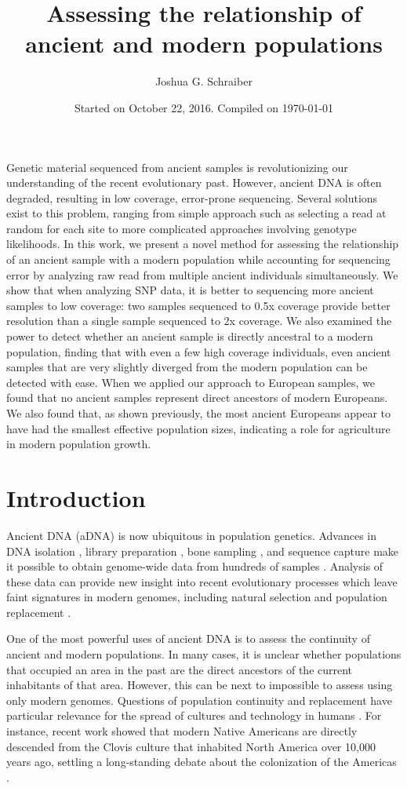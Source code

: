 \documentclass[11pt, oneside]{article}   	%
\title{Assessing the relationship of ancient and modern populations}
\author{Joshua G. Schraiber}
\date{Started on October 22, 2016. Compiled on \today}							%
\begin{document}
\maketitle

\abstract
Genetic material sequenced from ancient samples is revolutionizing our understanding of the recent evolutionary past. However, ancient DNA is often degraded, resulting in low coverage, error-prone sequencing. Several solutions exist to this problem, ranging from simple approach such as selecting a read at random for each site to more complicated approaches involving genotype likelihoods. In this work, we present a novel method for assessing the relationship of an ancient sample with a modern population while accounting for sequencing error by analyzing raw read from multiple ancient individuals simultaneously. We show that when analyzing SNP data, it is better to sequencing more ancient samples to low coverage: two samples sequenced to 0.5x coverage provide better resolution than a single sample sequenced to 2x coverage. We also examined the power to detect whether an ancient sample is directly ancestral to a modern population, finding that with even a few high coverage individuals, even ancient samples that are very slightly diverged from the modern population can be detected with ease. When we applied our approach to European samples, we found that no ancient samples represent direct ancestors of modern Europeans. We also found that, as shown previously, the most ancient Europeans appear to have had the smallest effective population sizes, indicating a role for agriculture in modern population growth.

\section{Introduction}
Ancient DNA (aDNA) is now ubiquitous in population genetics. Advances in DNA isolation \citep{dabney2013ancient}, library preparation \citep{meyer2012high}, bone sampling \citep{pinhasi2015optimal}, and sequence capture \cite{haak2015massive} make it possible to obtain genome-wide data from hundreds of samples \citep{haak2015massive, mathieson2015genome, allentoft2015population, fu2016genetic}. Analysis of these data can provide new insight into recent evolutionary processes which leave faint signatures in modern genomes, including natural selection \citep{schraiber2016bayesian, jewett2016effects} and population replacement \citep{sjodin2014assessing, lazaridis2014ancient}. 

One of the most powerful uses of ancient DNA is to assess the continuity of ancient and modern populations. In many cases, it is unclear whether populations that occupied an area in the past are the direct ancestors of the current inhabitants of that area. However, this can be next to impossible to assess using only modern genomes. Questions of population continuity and replacement have particular relevance for the spread of cultures and technology in humans \citep{lazaridis2016genomic}. For instance, recent work showed that modern Native Americans are directly descended from the Clovis culture that inhabited North America over 10,000 years ago, settling a long-standing debate about the colonization of the Americas \citep{rasmussen2014genome}.
\end{document}
